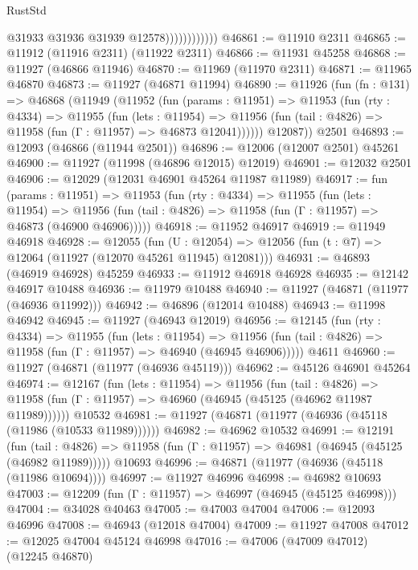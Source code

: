 \begin{lexlean}{RustStd}
\begin{coremodule}
                            @31933
                            @31936
                            @31939
                            @12578))))))))))))
@46861 := @11910 @2311
@46865 := @11912 (@11916 @2311) (@11922 @2311)
@46866 := @11931 @45258
@46868 := @11927 (@46866 @11946)
@46870 := @11969 (@11970 @2311)
@46871 := @11965 @46870
@46873 := @11927 (@46871 @11994)
@46890 := @11926
    (fun (fn : @131) =>
    @46868
      (@11949
        (@11952
          (fun (params : @11951) =>
          @11953
            (fun (rty : @4334) =>
            @11955
              (fun (lets : @11954) =>
              @11956 (fun (tail : @4826) => @11958 (fun (Γ : @11957) => @46873 @12041))))))
        @12087))
    @2501
@46893 := @12093 (@46866 (@11944 @2501))
@46896 := @12006 (@12007 @2501) @45261
@46900 := @11927 (@11998 (@46896 @12015) @12019)
@46901 := @12032 @2501
@46906 := @12029 (@12031 @46901 @45264 @11987 @11989)
@46917 := fun (params : @11951) =>
  @11953
    (fun (rty : @4334) =>
    @11955
      (fun (lets : @11954) =>
      @11956 (fun (tail : @4826) => @11958 (fun (Γ : @11957) => @46873 (@46900 @46906)))))
@46918 := @11952 @46917
@46919 := @11949 @46918
@46928 := @12055
    (fun (U : @12054) => @12056 (fun (t : @7) => @12064 (@11927 (@12070 @45261 @11945) @12081)))
@46931 := @46893 (@46919 @46928) @45259
@46933 := @11912 @46918 @46928
@46935 := @12142 @46917 @10488
@46936 := @11979 @10488
@46940 := @11927 (@46871 (@11977 (@46936 @11992)))
@46942 := @46896 (@12014 @10488)
@46943 := @11998 @46942
@46945 := @11927 (@46943 @12019)
@46956 := @12145
    (fun (rty : @4334) =>
    @11955
      (fun (lets : @11954) =>
      @11956 (fun (tail : @4826) => @11958 (fun (Γ : @11957) => @46940 (@46945 @46906)))))
    @4611
@46960 := @11927 (@46871 (@11977 (@46936 @45119)))
@46962 := @45126 @46901 @45264
@46974 := @12167
    (fun (lets : @11954) =>
    @11956
      (fun (tail : @4826) =>
      @11958 (fun (Γ : @11957) => @46960 (@46945 (@45125 (@46962 @11987 @11989))))))
    @10532
@46981 := @11927 (@46871 (@11977 (@46936 (@45118 (@11986 (@10533 @11989))))))
@46982 := @46962 @10532
@46991 := @12191
    (fun (tail : @4826) => @11958 (fun (Γ : @11957) => @46981 (@46945 (@45125 (@46982 @11989)))))
    @10693
@46996 := @46871 (@11977 (@46936 (@45118 (@11986 @10694))))
@46997 := @11927 @46996
@46998 := @46982 @10693
@47003 := @12209 (fun (Γ : @11957) => @46997 (@46945 (@45125 @46998)))
@47004 := @34028 @40463
@47005 := @47003 @47004
@47006 := @12093 @46996
@47008 := @46943 (@12018 @47004)
@47009 := @11927 @47008
@47012 := @12025 @47004 @45124 @46998
@47016 := @47006 (@47009 @47012) (@12245 @46870)

\end{coremodule}
\end{lexlean}
